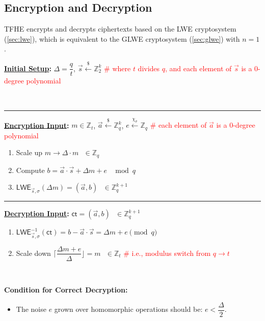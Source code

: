 \clearpage

\subsection{Encryption and Decryption}
\label{subsec:tfhe-enc-dec}

TFHE encrypts and decrypts ciphertexts based on the LWE cryptosystem (\autoref{sec:lwe}), which is equivalent to the GLWE cryptosystem (\autoref{sec:glwe}) with $n = 1$.


\begin{tcolorbox}[title={\textbf{\tboxlabel{\ref*{subsec:tfhe-enc-dec}} TFHE Encryption and Decryption}}]
\textbf{\underline{Initial Setup}:} $\Delta = \dfrac{q}{t}$, $\vec{s} \xleftarrow{\$} \mathbb{Z}_2^k$  \textcolor{red}{\# where $t$ divides $q$, and each element of $\vec{s}$ is a 0-degree polynomial}

$ $

\par\noindent\rule{\textwidth}{0.4pt}

\textbf{\underline{Encryption Input}:} $m \in \mathbb{Z}_t$, $\vec{a} \xleftarrow{\$} \mathbb{Z}_q^k$, $e \xleftarrow{\chi_\sigma} \mathbb{Z}_q$ \textcolor{red}{\# each element of $\vec{a}$ is a 0-degree polynomial}
\begin{enumerate}
\item Scale up $m \longrightarrow \Delta \cdot m \text{ } \in \mathbb{Z}_q$

\item Compute $b = \vec{a} \cdot \vec{s} + \Delta  m + e \text{ } \bmod q$
\item $\textsf{LWE}_{\vec{s},\sigma}(\Delta  m) = (\vec{a}, b) \text{ } \in \mathbb{Z}_q^{k + 1}$ 
\end{enumerate}

\par\noindent\rule{\textwidth}{0.4pt}

\textbf{\underline{Decryption Input}:} $\textsf{ct} = (\vec{a}, b) \text{ } \in \mathbb{Z}_q^{k+1}$
\begin{enumerate}
\item $\textsf{LWE}^{-1}_{\vec{s},\sigma}(\textsf{ct}) = b - \vec{a}\cdot \vec{s} = \Delta  m + e  \pmod q$

\item Scale down $\Bigg\lceil\dfrac{ \Delta  m + e } {\Delta}\Bigg\rfloor = m \text{ } \in \mathbb{Z}_t$ \textcolor{red}{ \# i.e., modulus switch from $q \rightarrow t$}
\end{enumerate}

$ $

\textbf{{Condition for Correct Decryption}:}
\begin{itemize}
\item The noise $e$ grown over homomorphic operations should be: $e < \dfrac{\Delta}{2}$. 
\end{itemize}

\end{tcolorbox}

